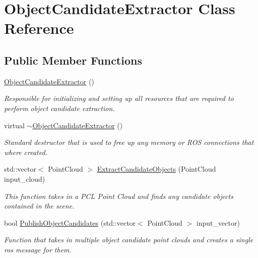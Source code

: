 \hypertarget{class_object_candidate_extractor}{\section{\-Object\-Candidate\-Extractor \-Class \-Reference}
\label{class_object_candidate_extractor}
}
\subsection*{\-Public \-Member \-Functions}
\begin{DoxyCompactItemize}
\item 
\hypertarget{class_object_candidate_extractor_a41916df0d27e926a337fff6e7e762010}{\hyperlink{class_object_candidate_extractor_a41916df0d27e926a337fff6e7e762010}{\-Object\-Candidate\-Extractor} ()}\label{class_object_candidate_extractor_a41916df0d27e926a337fff6e7e762010}

\begin{DoxyCompactList}\small\item\em \-Responsible for initializing and setting up all resources that are required to perform object candidate extraction. \end{DoxyCompactList}\item 
\hypertarget{class_object_candidate_extractor_ad1aa824172a7d2e6002d5d7e3104d5d3}{virtual \hyperlink{class_object_candidate_extractor_ad1aa824172a7d2e6002d5d7e3104d5d3}{$\sim$\-Object\-Candidate\-Extractor} ()}\label{class_object_candidate_extractor_ad1aa824172a7d2e6002d5d7e3104d5d3}

\begin{DoxyCompactList}\small\item\em \-Standard destructor that is used to free up any memory or \-R\-O\-S connections that where created. \end{DoxyCompactList}\item 
std\-::vector$<$ \-Point\-Cloud $>$ \hyperlink{class_object_candidate_extractor_a6a4adbcec19f94bc6073a4b2c2fa6f66}{\-Extract\-Candidate\-Objects} (\-Point\-Cloud input\-\_\-cloud)
\begin{DoxyCompactList}\small\item\em \-This function takes in a \-P\-C\-L \-Point \-Cloud and finds any candidate objects contained in the scene. \end{DoxyCompactList}\item 
bool \hyperlink{class_object_candidate_extractor_ab8848f6d86f7d7798ea30c2e04ae8b59}{\-Publish\-Object\-Candidates} (std\-::vector$<$ \-Point\-Cloud $>$ input\-\_\-vector)
\begin{DoxyCompactList}\small\item\em \-Function that takes in multiple object candidate point clouds and creates a single ros message for them. \end{DoxyCompactList}\end{DoxyCompactItemize}
